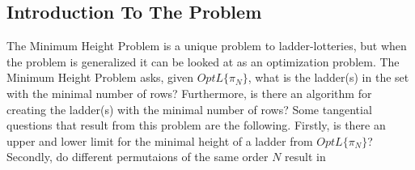 \subsection{Introduction To The Problem}
The Minimum Height Problem is a unique problem to ladder-lotteries, but when the problem is generalized it can be 
looked at as an optimization problem. The Minimum Height Problem asks, given $OptL\{\pi_{N}\}$, what is the 
ladder(s) in the set with the minimal number of rows? Furthermore, is there an algorithm for creating the ladder(s)
with the minimal number of rows? Some tangential questions that result from this problem are the following. Firstly, 
is there an upper and lower limit for the minimal height of a ladder from $OptL\{\pi_{N}\}$? Secondly, do different 
permutaions of the same order $N$ result in 